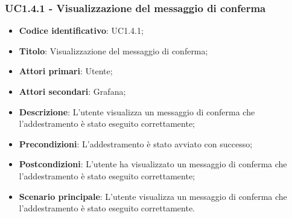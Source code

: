 \subsubsection{UC1.4.1 - Visualizzazione del messaggio di conferma}
\begin{itemize}
	\item \textbf{Codice identificativo}: UC1.4.1;
	\item \textbf{Titolo}: Visualizzazione del messaggio di conferma;
	\item \textbf{Attori primari}: Utente;
	\item \textbf{Attori secondari}: Grafana\glo;
	\item \textbf{Descrizione}: L'utente visualizza un messaggio di conferma che l'addestramento è stato eseguito correttamente;
	\item \textbf{Precondizioni}: L'addestramento è stato avviato con successo;
	\item \textbf{Postcondizioni}: L'utente ha visualizzato un messaggio di conferma che l'addestramento è stato eseguito correttamente;
	\item \textbf{Scenario principale}: L'utente visualizza un messaggio di conferma che l'addestramento è stato eseguito correttamente.
\end{itemize}
